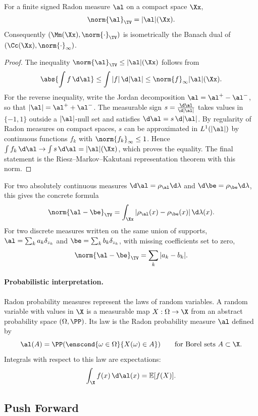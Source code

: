 \begin{prop}\label{prop-tv-dual-measure}
	For a finite signed Radon measure $\al$ on a compact space $\Xx$,
	\[
		\norm{\al}_{\TV}=|\al|(\Xx).
	\]
	Consequently $(\Mm(\Xx),\norm{\cdot}_{\TV})$ is isometrically the Banach dual of $(\Cc(\Xx),\norm{\cdot}_\infty)$.
\end{prop}
\begin{proof}
	The inequality $\norm{\al}_{\TV}\leq |\al|(\Xx)$ follows from
	\[
		\abs{\int f\,\d\al}\leq \int |f|\,\d|\al|\leq \norm{f}_\infty |\al|(\Xx).
	\]
	For the reverse inequality, write the Jordan decomposition $\al=\al^+-\al^-$, so that $|\al|=\al^++\al^-$. The measurable sign $s=\frac{\d\al}{\d|\al|}$ takes values in $\{-1,1\}$ outside a $|\al|$-null set and satisfies $\d\al=s\,\d|\al|$. By regularity of Radon measures on compact spaces, $s$ can be approximated in $L^1(|\al|)$ by continuous functions $f_k$ with $\norm{f_k}_\infty\leq1$. Hence $\int f_k\,\d\al\to\int s\,\d\al=|\al|(\Xx)$, which proves the equality. The final statement is the Riesz--Markov--Kakutani representation theorem with this norm.
\end{proof}

For two absolutely continuous measures $\d\al=\rho_\al\d\lambda$ and $\d\be=\rho_\be\d\lambda$, this gives the concrete formula
\[
	\norm{\al-\be}_{\TV}
	=
	\int_\Xx |\rho_\al(x)-\rho_\be(x)|\,\d\lambda(x).
\]
For two discrete measures written on the same union of supports, $\al=\sum_k a_k\delta_{z_k}$ and $\be=\sum_k b_k\delta_{z_k}$, with missing coefficients set to zero,
\[
	\norm{\al-\be}_{\TV}
	=
	\sum_k |a_k-b_k|.
\]
\paragraph{Probabilistic interpretation.}

Radon probability measures represent the laws of random variables. A random variable with values in $\X$ is a measurable map $X:\Omega\to\X$ from an abstract probability space $(\Omega,\PP)$. Its law is the Radon probability measure $\al$ defined by
\[
	\al(A)=\PP(\enscond{\omega\in\Omega}{X(\omega)\in A})
	\qquad\text{for Borel sets } A\subset \X .
\]
Integrals with respect to this law are expectations:
\[
	\int_\X f(x)\,\d\al(x)=\mathbb{E}[f(X)].
\]


\subsection{Push Forward}
\label{sec-push-forward}



